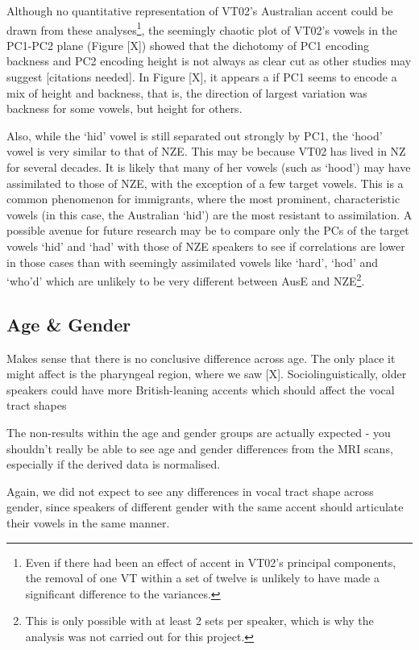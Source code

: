 Although no quantitative representation of VT02's Australian accent could be drawn from these analyses\footnote{Even if there had been an effect of accent in VT02's principal components, the removal of one VT within a set of twelve is unlikely to have made a significant difference to the variances.}, the seemingly chaotic plot of VT02's vowels in the PC1-PC2 plane (Figure [X]) showed that the dichotomy of PC1 encoding backness and PC2 encoding height is not always as clear cut as other studies may suggest [citations needed]. In Figure [X], it appears a if PC1 seems to encode a mix of height and backness, that is, the direction of largest variation was backness for some vowels, but height for others.

Also, while the `hid' vowel is still separated out strongly by PC1, the `hood' vowel is very similar to that of NZE. This may be because VT02 has lived in NZ for several decades. It is likely that many of her vowels (such as `hood') may have assimilated to those of NZE, with the exception of a few target vowels. This is a common phenomenon for immigrants, where the most prominent, characteristic vowels (in this case, the Australian `hid') are the most resistant to assimilation. A possible avenue for future research may be to compare only the PCs of the target vowels `hid' and `had' with those of NZE speakers to see if correlations are lower in those cases than with seemingly assimilated vowels like `hard', `hod' and `who'd' which are unlikely to be very different between AusE and NZE\footnote{This is only possible with at least 2 sets per speaker, which is why the analysis was not carried out for this project.}.

\subsection{Age \& Gender}

Makes sense that there is no conclusive difference across age. The only place it might affect is the pharyngeal region, where we saw [X]. Sociolinguistically, older speakers could have more British-leaning accents which should affect the vocal tract shapes

The non-results within the age and gender groups are actually expected - you shouldn't really be able to see age and gender differences from the MRI scans, especially if the derived data is normalised.

Again, we did not expect to see any differences in vocal tract shape across gender, since speakers of different gender with the same accent should articulate their vowels in the same manner.


